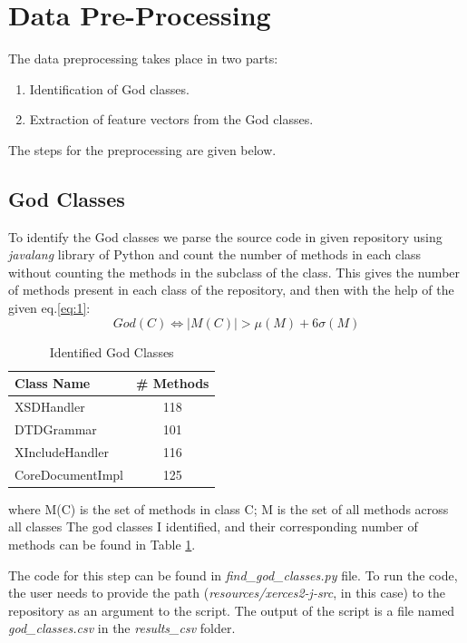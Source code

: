\documentclass{article}
\begin{document}
\section{Data Pre-Processing}
The data preprocessing takes place in two parts:
\begin{enumerate}
    \item Identification of God classes.
    \item Extraction of feature vectors from the God classes.
\end{enumerate}
The steps for the preprocessing are given below.
\subsection{God Classes}
To identify the God classes we parse the source code in given repository using \textit{javalang} library of Python and 
count the number of methods in each class without counting the methods in the 
subclass of the class. This gives the number of methods present in each class of the repository,
and then with the help of the given eq.\ref{eq:1}:
\begin{equation}
    God(C) \iff | M(C) | > \mu(M) + 6\sigma(M)
    \label{eq:1}
\end{equation}
\begin{table}[]
    \centering
    \begin{tabular}{lc}
        \hline
        \textbf{Class Name} &\textbf{\# Methods} \\
        \hline\hline
        {XSDHandler} & {118}\\
        {DTDGrammar} & {101}\\
        {XIncludeHandler} & {116}\\
        {CoreDocumentImpl} & {125}\\
        \hline
    \end{tabular}
    \caption{Identified God Classes}
    \label{tab:god_classes}
\end{table}
where M(C) is the set of methods in class C; M is the set of all methods across all classes
The god classes I identified, and their corresponding number of methods can be found in Table \ref{tab:god_classes}.

The code for this step can be found in \textit{find\_god\_classes.py} file.
To run the code, the user needs to provide the path (\textit{resources/xerces2-j-src}, in this case) to the repository as an argument to the script.
The output of the script is a file named \textit{god\_classes.csv} in the \textit{results\_csv} folder.
\end{document}
